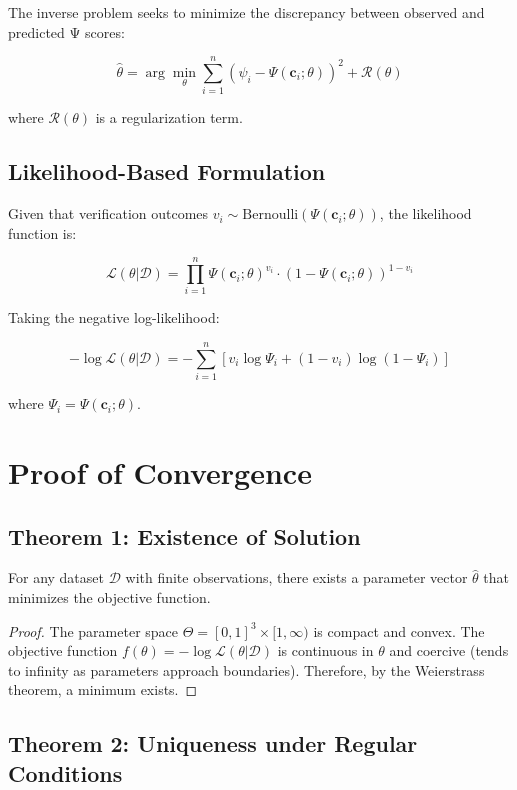 \documentclass[11pt]{article}
\begin{document}
The inverse problem seeks to minimize the discrepancy between observed and predicted Ψ scores:

\[
\hat{\theta} = \arg\min_{\theta} \sum_{i=1}^n \left(\psi_i - \Psi(\mathbf{c}_i; \theta)\right)^2 + \mathcal{R}(\theta)
\]

where $\mathcal{R}(\theta)$ is a regularization term.

\subsection{Likelihood-Based Formulation}

Given that verification outcomes $v_i \sim \text{Bernoulli}(\Psi(\mathbf{c}_i; \theta))$, the likelihood function is:

\[
\mathcal{L}(\theta | \mathcal{D}) = \prod_{i=1}^n \Psi(\mathbf{c}_i; \theta)^{v_i} \cdot (1 - \Psi(\mathbf{c}_i; \theta))^{1-v_i}
\]

Taking the negative log-likelihood:

\[
-\log \mathcal{L}(\theta | \mathcal{D}) = -\sum_{i=1}^n \left[ v_i \log \Psi_i + (1-v_i) \log (1 - \Psi_i) \right]
\]

where $\Psi_i = \Psi(\mathbf{c}_i; \theta)$.

\section{Proof of Convergence}

\subsection{Theorem 1: Existence of Solution}

\begin{theorem}[Existence]
For any dataset $\mathcal{D}$ with finite observations, there exists a parameter vector $\hat{\theta}$ that minimizes the objective function.
\end{theorem}

\begin{proof}
The parameter space $\Theta = [0,1]^3 \times [1,\infty)$ is compact and convex. The objective function $f(\theta) = -\log \mathcal{L}(\theta | \mathcal{D})$ is continuous in $\theta$ and coercive (tends to infinity as parameters approach boundaries). Therefore, by the Weierstrass theorem, a minimum exists.
\end{proof}

\subsection{Theorem 2: Uniqueness under Regular Conditions}
\end{document}
